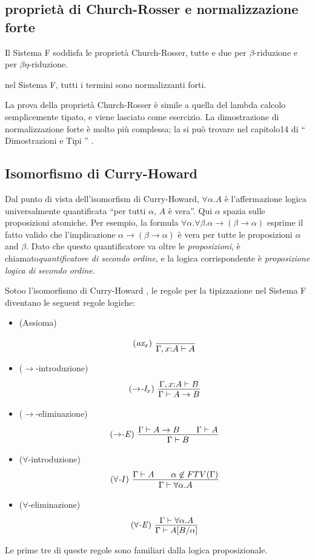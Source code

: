 \documentclass{article}
\begin{document}
\subsection{propriet\`a di Church-Rosser e normalizzazione forte}

\begin{theorem}
	Il Sistema F soddisfa le propriet\`a Church-Rosser, tutte e due per
	$\beta$-riduzione e per $\beta\eta$-riduzione.
\end{theorem}

\begin{theorem}\label{thm-strong-norm-system-f}
	nel Sistema F, tutti i termini sono normalizzanti forti.
\end{theorem}

La prova della propriet\`a Church-Rosser \`e simile a quella del
lambda calcolo semplicemente tipato, e viene lasciato come esercizio.
La dimostrazione di normalizzazione forte \`e molto pi\`u complessa;
la si pu\`o trovare nel capitolo14 di `` Dimostrazioni e Tipi '' {\cite{GLT89}}.

\subsection{Isomorfismo di Curry-Howard }

Dal punto di vista dell'isomorfism di Curry-Howard,
$\forall\alpha.A$ \`e l'affermazione logica universalmente quantificata
``per tutti $\alpha$, $A$ \`e vera''. Qui $\alpha$ spazia sulle proposizioni atomiche.
Per esempio, la formula
$\forall\alpha.\forall\beta.\alpha\to(\beta\to\alpha)$ esprime il
fatto valido che l'implicazione $\alpha\to(\beta\to\alpha)$ \`e vera
per tutte le proposizioni $\alpha$ and $\beta$. Dato che questo quantificatore
va oltre le {\em proposizioni}, \`e chiamato{\em quantificatore
	di secondo ordine}, e la logica corrispondente \`e {\em proposizione logica di secondo ordine}. 

Sotoo l'isomorfismo di Curry-Howard , le regole per la tipizzazione nel Sistema F
diventano le seguent regole logiche:
\begin{itemize}
	\item (Assioma)
	\[ \trule{ax$_x$}\ \deriv{}{\Gamma,\typ{x}{A}\tj A}
	\]
	\item ($\to$-introduzione)
	\[ \trule{$\to$-I$_x$}\ \deriv{\Gamma,\typ{x}{A}\tj B}{\Gamma\tj A\to B}
	\]
	\item ($\to$-eliminazione)
	\[ \trule{$\to$-E}\ \deriv{\Gamma\tj A\to B\sep \Gamma\tj A}{\Gamma\tj B}
	\]
	\item ($\forall$-introduzione)
	\[ \trule{$\forall$-I}\ \deriv{\Gamma\tj A\sep \alpha\not\in\FTV{\Gamma}}{\Gamma\tj \forall\alpha.A}
	\]
	\item ($\forall$-eliminazione)
	\[ \trule{$\forall$-E}\ \deriv{\Gamma\tj \forall\alpha.A}{\Gamma\tj A[B/\alpha]}
	\]
\end{itemize}
Le prime tre di queste regole sono familiari dalla logica proposizionale.
\end{document}

